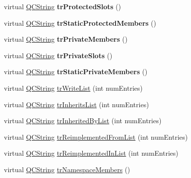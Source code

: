 \begin{DoxyCompactItemize}
virtual \mbox{\hyperlink{class_q_c_string}{Q\+C\+String}} {\bfseries tr\+Protected\+Slots} ()
\item 
\mbox{\label{class_translator_vietnamese_a75b8af43d2ad109ceb3c9b6e37930f4f}} 
virtual \mbox{\hyperlink{class_q_c_string}{Q\+C\+String}} {\bfseries tr\+Static\+Protected\+Members} ()
\item 
\mbox{\label{class_translator_vietnamese_a5f26ff73296bd2c2cb44e3dab5f1ed89}} 
virtual \mbox{\hyperlink{class_q_c_string}{Q\+C\+String}} {\bfseries tr\+Private\+Members} ()
\item 
\mbox{\label{class_translator_vietnamese_ac78494935aad1339dfa13060fff39453}} 
virtual \mbox{\hyperlink{class_q_c_string}{Q\+C\+String}} {\bfseries tr\+Private\+Slots} ()
\item 
\mbox{\label{class_translator_vietnamese_afbe4f0265105047152e91bb8ccdb3a34}} 
virtual \mbox{\hyperlink{class_q_c_string}{Q\+C\+String}} {\bfseries tr\+Static\+Private\+Members} ()
\item 
virtual \mbox{\hyperlink{class_q_c_string}{Q\+C\+String}} \mbox{\hyperlink{class_translator_vietnamese_a9e37dca3640241e3c29516f2e756e346}{tr\+Write\+List}} (int num\+Entries)
\item 
virtual \mbox{\hyperlink{class_q_c_string}{Q\+C\+String}} \mbox{\hyperlink{class_translator_vietnamese_acebe0baec5bca7de66b2374e7f59fad1}{tr\+Inherits\+List}} (int num\+Entries)
\item 
virtual \mbox{\hyperlink{class_q_c_string}{Q\+C\+String}} \mbox{\hyperlink{class_translator_vietnamese_a9825944527da9ee754888c84f7281f96}{tr\+Inherited\+By\+List}} (int num\+Entries)
\item 
virtual \mbox{\hyperlink{class_q_c_string}{Q\+C\+String}} \mbox{\hyperlink{class_translator_vietnamese_af3f68c6304668410d08a21f422cc2a02}{tr\+Reimplemented\+From\+List}} (int num\+Entries)
\item 
virtual \mbox{\hyperlink{class_q_c_string}{Q\+C\+String}} \mbox{\hyperlink{class_translator_vietnamese_a1479a8da46f19bee798abb32108e84a4}{tr\+Reimplemented\+In\+List}} (int num\+Entries)
\item 
virtual \mbox{\hyperlink{class_q_c_string}{Q\+C\+String}} \mbox{\hyperlink{class_translator_vietnamese_aae4722398dc866d913df382f77de4eb3}{tr\+Namespace\+Members}} ()

\end{DoxyCompactItemize}
